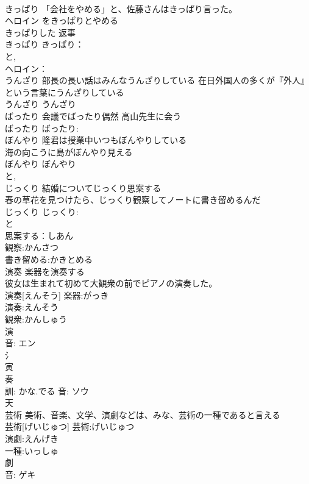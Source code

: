 \documentclass[8pt]{extreport}
\begin{document}
\begin{CJK}{UTF8}{min}
\\	きっぱり	「会社をやめる」と、佐藤さんはきっぱり言った。 
\\	ヘロイン をきっぱりとやめる 
\\	きっぱりした 返事 
\\	きっぱり			きっぱり：
\\	と, 
\\	ヘロイン：
\\	うんざり	部長の長い話はみんなうんざりしている 在日外国人の多くが『外人』という言葉にうんざりしている 
\\	うんざり			うんざり
\\	ばったり	会議でばったり偶然 高山先生に会う 
\\	ばったり			ばったり: 
\\	ぼんやり	隆君は授業中いつもぼんやりしている 
\\	海の向こうに島がぼんやり見える 
\\	ぼんやり			ぼんやり
\\	と, 
\\	じっくり	結婚についてじっくり思案する 
\\	春の草花を見つけたら、じっくり観察してノートに書き留めるんだ 
\\	じっくり			じっくり:
\\	と 
\\	思案する：しあん
\\	観察:かんさつ
\\	書き留める:かきとめる
\\	演奏	楽器を演奏する 
\\	彼女は生まれて初めて大観衆の前でピアノの演奏した。 
\\	演奏[えんそう]			楽器:がっき
\\	演奏:えんそう
\\	観衆:かんしゅう
\\	演 
\\	音: エン 
\\	氵 
\\	寅 
\\	奏 
\\	訓: かな.でる 音: ソウ 
\\	天 
\\	芸術	美術、音楽、文学、演劇などは、みな、芸術の一種であると言える 
\\	芸術[げいじゅつ]			芸術:げいじゅつ
\\	演劇:えんげき
\\	一種:いっしゅ
\\	劇 
\\	音: ゲキ 

\end{CJK}
\end{document}
